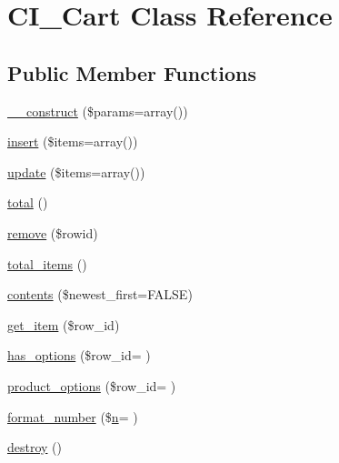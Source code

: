 \hypertarget{class_c_i___cart}{}\section{C\+I\+\_\+\+Cart Class Reference}
\label{class_c_i___cart}
\subsection*{Public Member Functions}
\begin{DoxyCompactItemize}
\item 
\hyperlink{class_c_i___cart_a568ecdb0d73d2a870f33189739922a50}{\+\_\+\+\_\+construct} (\$params=array())
\item 
\hyperlink{class_c_i___cart_a07488e002c513013079157a9fe61a8e3}{insert} (\$items=array())
\item 
\hyperlink{class_c_i___cart_adddf5d1a4f704b647f28b0322f8b64f2}{update} (\$items=array())
\item 
\hyperlink{class_c_i___cart_a9efa17b570797933c7c5b0c68f743a55}{total} ()
\item 
\hyperlink{class_c_i___cart_acb40031fae650e22e4a32878c02dfbf7}{remove} (\$rowid)
\item 
\hyperlink{class_c_i___cart_a785be13903ee65b8936d523b2728e53a}{total\+\_\+items} ()
\item 
\hyperlink{class_c_i___cart_a9d7b86f0ac41c6301e6373644011d87f}{contents} (\$newest\+\_\+first=F\+A\+L\+S\+E)
\item 
\hyperlink{class_c_i___cart_a73841dfae18a2719c7eb6d31978067a9}{get\+\_\+item} (\$row\+\_\+id)
\item 
\hyperlink{class_c_i___cart_a33ede6b1b95af9e155a995934b6fc8ba}{has\+\_\+options} (\$row\+\_\+id= \textquotesingle{}\textquotesingle{})
\item 
\hyperlink{class_c_i___cart_a3f1fa029eae7acd65f5a622fd5f50d2d}{product\+\_\+options} (\$row\+\_\+id= \textquotesingle{}\textquotesingle{})
\item 
\hyperlink{class_c_i___cart_a0ee4758d55d11ab91f5b7ac04b1eedc3}{format\+\_\+number} (\$\hyperlink{cli_2error__general_8php_ace0fd03cd383f20ce6ea63247a207294}{n}= \textquotesingle{}\textquotesingle{})
\item 
\hyperlink{class_c_i___cart_aa118461de946085fe42989193337044a}{destroy} ()
\end{DoxyCompactItemize}
